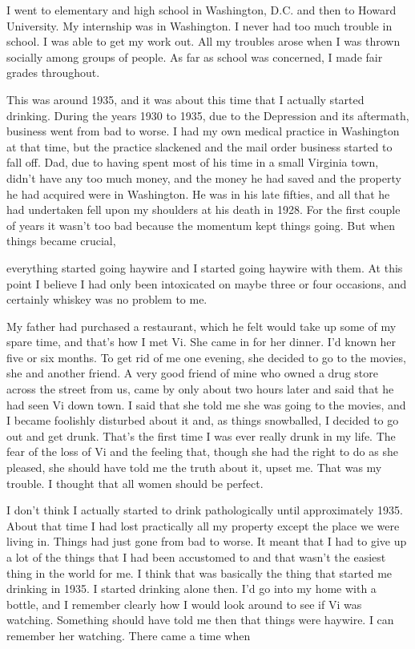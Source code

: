 I went to elementary and high school in Washington, D.C. and then to Howard University. My internship was in Washington. I never had too much trouble in school. I was able to get my work out. All my troubles arose when I was thrown socially among groups of people. As far as school was concerned, I made fair grades throughout.

This was around 1935, and it was about this time that I actually started drinking. During the years 1930 to 1935, due to the Depression and its aftermath, business went from bad to worse. I had my own medical practice in Washington at that time, but the practice slackened and the mail order business started to fall off. Dad, due to having spent most of his time in a small Virginia town, didn’t have any too much money, and the money he had saved and the property he had acquired were in Washington. He was in his late fifties, and all that he had undertaken fell upon my shoulders at his death in 1928. For the first couple of years it wasn’t too bad because the momentum kept things going. But when things became crucial,

everything started going haywire and I started going haywire with them. At this point I believe I had only been intoxicated on maybe three or four occasions, and certainly whiskey was no problem to me.

My father had purchased a restaurant, which he felt would take up some of my spare time, and that’s how I met Vi. She came in for her dinner. I’d known her five or six months. To get rid of me one evening, she decided to go to the movies, she and another friend. A very good friend of mine who owned a drug store across the street from us, came by only about two hours later and said that he had seen Vi down town. I said that she told me she was going to the movies, and I became foolishly disturbed about it and, as things snowballed, I decided to go out and get drunk. That’s the first time I was ever really drunk in my life. The fear of the loss of Vi and the feeling that, though she had the right to do as she pleased, she should have told me the truth about it, upset me. That was my trouble. I thought that all women should be perfect.

I don’t think I actually started to drink pathologically until approximately 1935. About that time I had lost practically all my property except the place we were living in. Things had just gone from bad to worse. It meant that I had to give up a lot of the things that I had been accustomed to and that wasn’t the easiest thing in the world for me. I think that was basically the thing that started me drinking in 1935. I started drinking alone then. I’d go into my home with a bottle, and I remember clearly how I would look around to see if Vi was watching. Something should have told me then that things were haywire. I can remember her watching. There came a time when

